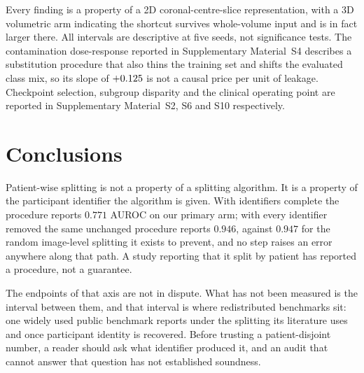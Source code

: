 \documentclass[pdflatex,sn-vancouver-num]{sn-jnl}
\begin{document}
Every finding is a property of a 2D coronal-centre-slice representation, with a
3D volumetric arm indicating the shortcut survives whole-volume input and is in
fact larger there. All intervals are descriptive at five seeds, not significance
tests. The contamination dose-response reported in Supplementary Material~S4
describes a substitution procedure that also thins the training set and shifts
the evaluated class mix, so its slope of $+0.125{}$ is not a causal price
per unit of leakage. Checkpoint selection, subgroup disparity and the clinical
operating point are reported in Supplementary Material~S2, S6 and S10
respectively.

\section{Conclusions}
\label{sec:conclusion}

Patient-wise splitting is not a property of a splitting algorithm. It is a
property of the participant identifier the algorithm is given. With identifiers
complete the procedure reports $0.771$ AUROC on our primary arm; with every
identifier removed the same unchanged procedure reports $0.946$, against
$0.947$ for the random image-level splitting it exists to prevent, and no step
raises an error anywhere along that path. A study reporting that it split by
patient has reported a procedure, not a guarantee.

The endpoints of that axis are not in dispute. What has not been measured is the
interval between them, and that interval is where redistributed benchmarks sit:
one widely used public benchmark reports \TierOneRandomAUROC{} under the
splitting its literature uses and \TierOneTrueAUROC{} once participant identity
is recovered. Before trusting a patient-disjoint number, a reader should ask
what identifier produced it, and an audit that cannot answer that question has
not established soundness.
\end{document}
